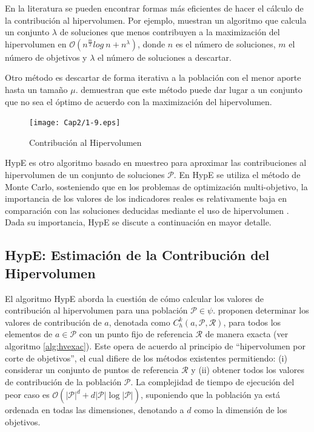    En la literatura se pueden encontrar formas m\'as eficientes de hacer el c\'alculo de la contribuci\'on al 
   hipervolumen. Por ejemplo, \cite{bringmann} muestran un algoritmo que calcula un conjunto $\lambda$ de soluciones 
   que menos contribuyen a la maximizaci\'on del hipervolumen en $\mathcal{O}(n^{\frac{m}{2}} log~n + n^{\lambda})$, 
   donde $n$ es el n\'umero de soluciones, $m$ el n\'umero de objetivos y $\lambda$ el n\'umero de soluciones a 
   descartar.
 
    Otro m\'etodo es descartar de forma iterativa a la poblaci\'on con el menor aporte hasta un tama\~no $\mu$. 
    \cite{Bringmann2} demuestran que este m\'etodo puede dar lugar a un conjunto que no sea el \'optimo de acuerdo con la 
    maximizaci\'on del hipervolumen. 

    \begin{figure}
    \centering
    \texttt{[image: Cap2/1-9.eps]}
    \caption{Contribuci\'on al Hipervolumen}
    \label{fig:hypcont}
    \end{figure}
   
    HypE es otro algoritmo basado en muestreo para aproximar las contribuciones al hipervolumen de un conjunto de 
    soluciones $\mathcal{P}$. En HypE se utiliza el m\'etodo de Monte Carlo, sosteniendo que en los 
    problemas de optimizaci\'on multi-objetivo, la importancia de los valores de los indicadores reales es relativamente baja 
    en comparaci\'on con las soluciones deducidas mediante el uso de hipervolumen \cite{Bader11}. Dada su importancia, HypE
    se discute a continuaci\'on en mayor detalle.
    
  \subsection{HypE: Estimaci\'on de la Contribuci\'on del Hipervolumen}
  
  El algoritmo HypE aborda la cuesti\'on de c\'omo calcular los valores de contribuci\'on al hipervolumen 
  para una poblaci\'on $\mathcal{P} \in \psi$.  \cite{Bader11} proponen determinar los valores de contribuci\'on
  de $a$, denotada como $C^k_h\left(a,\mathcal{P},\mathcal{R} \right)$, para todos los elementos de $a \in \mathcal{P}$ con 
  un punto fijo de referencia $\mathcal{R}$ de manera exacta (ver algoritmo \ref{alg:hvexac}). Este opera de acuerdo al principio de ``hipervolumen por corte 
  de objetivos'', el cual difiere de los m\'etodos existentes permitiendo: (i) considerar un conjunto de puntos de 
  referencia $\mathcal{R}$ y (ii) obtener todos los valores de contribuci\'on de la poblaci\'on $\mathcal{P}$. La complejidad 
  de tiempo de ejecuci\'on del peor caso es  $\mathcal{O}(|\mathcal{P}|^d + d|\mathcal{P}|\log |\mathcal{P}|)$, suponiendo que 
  la poblaci\'on ya est\'a ordenada en todas las dimensiones, denotando a $d$ como la dimensi\'on de los objetivos. 
  
